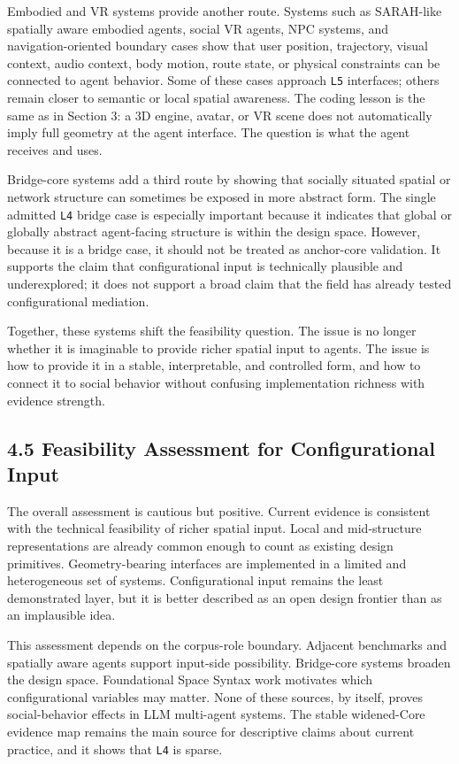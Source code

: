 \documentclass[
  twocolumn]{article}
\begin{document}
Embodied and VR systems provide another route. Systems such as
SARAH-like spatially aware embodied agents, social VR agents, NPC
systems, and navigation-oriented boundary cases show that user position,
trajectory, visual context, audio context, body motion, route state, or
physical constraints can be connected to agent behavior. Some of these
cases approach \texttt{L5} interfaces; others remain closer to semantic
or local spatial awareness. The coding lesson is the same as in Section
3: a 3D engine, avatar, or VR scene does not automatically imply full
geometry at the agent interface. The question is what the agent receives
and uses.

Bridge-core systems add a third route by showing that socially situated
spatial or network structure can sometimes be exposed in more abstract
form. The single admitted \texttt{L4} bridge case is especially
important because it indicates that global or globally abstract
agent-facing structure is within the design space. However, because it
is a bridge case, it should not be treated as anchor-core validation. It
supports the claim that configurational input is technically plausible
and underexplored; it does not support a broad claim that the field has
already tested configurational mediation.

Together, these systems shift the feasibility question. The issue is no
longer whether it is imaginable to provide richer spatial input to
agents. The issue is how to provide it in a stable, interpretable, and
controlled form, and how to connect it to social behavior without
confusing implementation richness with evidence strength.

\subsection{4.5 Feasibility Assessment for Configurational
Input}\label{feasibility-assessment-for-configurational-input}

The overall assessment is cautious but positive. Current evidence is
consistent with the technical feasibility of richer spatial input. Local
and mid-structure representations are already common enough to count as
existing design primitives. Geometry-bearing interfaces are implemented
in a limited and heterogeneous set of systems. Configurational input
remains the least demonstrated layer, but it is better described as an
open design frontier than as an implausible idea.

This assessment depends on the corpus-role boundary. Adjacent benchmarks
and spatially aware agents support input-side possibility. Bridge-core
systems broaden the design space. Foundational Space Syntax work
motivates which configurational variables may matter. None of these
sources, by itself, proves social-behavior effects in LLM multi-agent
systems. The stable widened-Core evidence map remains the main source
for descriptive claims about current practice, and it shows that
\texttt{L4} is sparse.
\end{document}
